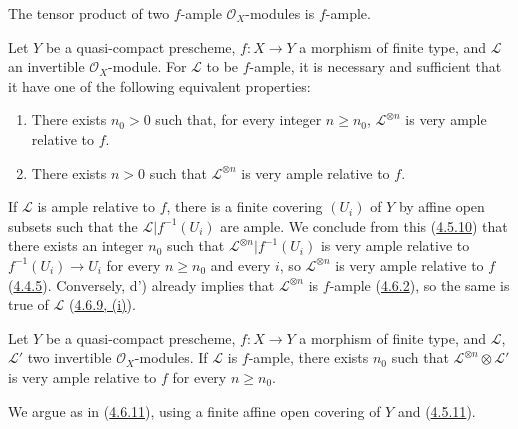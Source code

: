 \begin{corollary}[4.6.10]
\label{II.4.6.10}
The tensor product of two $f$-ample $\mathcal{O}_X$-modules is
$f$-ample.
\end{corollary}

\begin{proposition}[4.6.11]
\label{II.4.6.11}
Let $Y$ be a quasi-compact prescheme, $f:X\to Y$ a morphism of finite
type, and $\mathcal{L}$ an invertible $\mathcal{O}_X$-module. For
$\mathcal{L}$ to be $f$-ample, it is necessary and sufficient that it have one of the
following equivalent properties:
\begin{enumerate}
  \item[\rm{d)}] There exists $n_0>0$ such that, for every integer $n\geq n_0$,
  $\mathcal{L}^{\otimes n}$ is very ample relative to $f$.
  \item[\rm{d')}] There exists $n>0$ such that $\mathcal{L}^{\otimes n}$ is
  very ample relative to $f$.
\end{enumerate}
\end{proposition}

If $\mathcal{L}$ is ample relative to $f$, there is a finite covering
$(U_i)$ of $Y$ by affine open subsets such that the
$\mathcal{L}|f^{-1}(U_i)$ are ample. We conclude from this
(\hyperref[II.4.5.10]{4.5.10}) that there exists an integer $n_0$ such that
$\mathcal{L}^{\otimes n}|f^{-1}(U_i)$ is very ample relative to
$f^{-1}(U_i)\to U_i$ for every $n\geq n_0$ and every $i$, so
$\mathcal{L}^{\otimes n}$ is very ample relative to $f$
(\hyperref[II.4.4.5]{4.4.5}). Conversely, d') already implies that
$\mathcal{L}^{\otimes n}$ is $f$-ample
(\hyperref[II.4.6.2]{4.6.2}), so the same is true of $\mathcal{L}$
(\hyperref[II.4.6.9]{4.6.9, (i)}).

\begin{corollary}[4.6.12]
\label{II.4.6.12}
Let $Y$ be a quasi-compact prescheme, $f:X\to Y$ a morphism of finite
type, and $\mathcal{L}$, $\mathcal{L}'$ two invertible
$\mathcal{O}_X$-modules. If $\mathcal{L}$ is $f$-ample, there exists $n_0$ such that
$\mathcal{L}^{\otimes n}\otimes\mathcal{L}'$ is very ample relative
to $f$ for every $n\geq n_0$.
\end{corollary}

We argue as in (\hyperref[II.4.6.11]{4.6.11}), using a finite
affine open covering of $Y$ and
(\hyperref[II.4.5.11]{4.5.11}).

